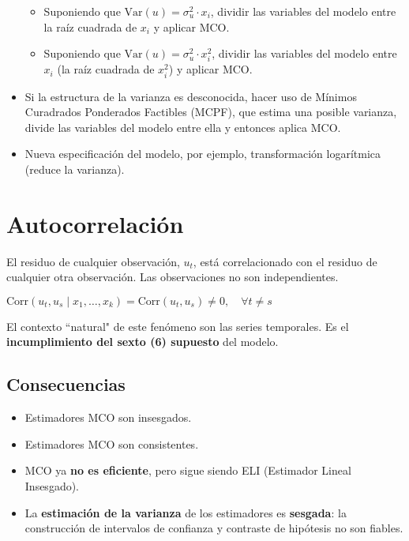 \documentclass[10pt, a4paper, landscape]{article}
\newcommand{\Var}{\mathrm{Var}}
\newcommand{\Corr}{\mathrm{Corr}}
\begin{document}
\begin{multicols}{3}
\begin{itemize}[leftmargin=*]
			\begin{itemize}[leftmargin=*]
				\item Suponiendo que $\Var(u) = \sigma^{2}_{u} \cdot x_{i}$, dividir las variables del modelo entre la raíz cuadrada de $x_{i}$ y aplicar MCO.
				\item Suponiendo que $\Var(u) = \sigma^{2}_{u} \cdot x_{i}^{2}$, dividir las variables del modelo entre $x_{i}$ (la raíz cuadrada de $x_{i}^{2}$) y aplicar MCO.
			\end{itemize}
			
			\item Si la estructura de la varianza es desconocida, hacer uso de Mínimos Curadrados Ponderados Factibles (MCPF), que estima una posible varianza, divide las variables del modelo entre ella y entonces aplica MCO.
			\item Nueva especificación del modelo, por ejemplo, transformación logarítmica (reduce la varianza).
		\end{itemize}
		
		\columnbreak
		
		\section*{Autocorrelación}
		
		El residuo de cualquier observación, $u_{t}$, está correlacionado con el residuo de cualquier otra observación. Las observaciones no son independientes.
		
		\begin{center}
			$\Corr(u_{t}, u_{s} \mid x_{1}, \ldots, x_{k}) = \Corr(u_{t}, u_{s}) \neq 0, \quad \forall t \neq s$
		\end{center}
		
		El contexto ``natural" de este fenómeno son las series temporales. Es el \textbf{incumplimiento del sexto (6) supuesto} del modelo.
		
		\subsection*{Consecuencias}
		
		\begin{itemize}[leftmargin=*]
			\item Estimadores MCO son insesgados.
			\item Estimadores MCO son consistentes.
			\item MCO ya \textbf{no es eficiente}, pero sigue siendo ELI (Estimador Lineal Insesgado).
			\item La \textbf{estimación de la varianza} de los estimadores es \textbf{sesgada}: la construcción de intervalos de confianza y contraste de hipótesis no son fiables.
		\end{itemize}
		

\end{multicols}
\end{document}
